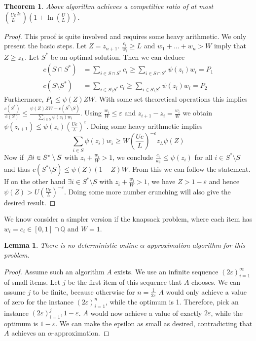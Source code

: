 \documentclass[a4paper, 12pt]{article}
\newtheorem{theorem}{Theorem}[section]
\newtheorem{lemma}{Lemma}[section]
\begin{document}
	\begin{theorem}
		Above algorithm achieves a competitive ratio of at most $\left(\frac{Ue}{L}^{2\varepsilon}\right)\left(1+\ln \left(\frac{U}{L}\right)\right)$. 
	\end{theorem}
	\begin{proof}
		This proof is quite involved and requires some heavy arithmetic. We only present the basic steps.
		Let $Z = z_{n+1}$. $\frac{c_i}{w_i} \geq L$ and $w_1+...+w_n > W$ imply that $Z \geq z_L$. Let $S^*$ be an optimal solution. Then we can deduce \begin{align}
			c(S \cap S^*) &= \sum_{i \in S\cap S^*} c_i \geq \sum_{i \in S\cap S^*}\psi(z_i)w_i = P_1\\
			c(S\setminus S^*) &= \sum_{i \in S\setminus S^*} c_i \geq \sum_{i \in S\setminus S^*} \psi(z_i)w_i = P_2
		\end{align}
	Furthermore, \(P_1 \leq \psi(Z)ZW\). With some set theoretical operations this implies $\frac{c(S^*)}{c(S)} \leq \frac{\psi(Z)ZW + c(S^*\setminus S)}{\sum_{i \in S}\psi(z_i)w_i}$. Using $\frac{w_i}{W} \leq \varepsilon$ and $z_{i+1} - z_i = \frac{w_i}{W}$ we obtain $\psi(z_{i+1}) \leq \psi(z_i)\left(\frac{Ue}{L}\right)^\varepsilon$. Doing some heavy arithmetic implies \[\sum_{i \in S}\psi(z_i)w_i \geq W\left(\frac{Ue}{L}\right)^{-\varepsilon}z_L\psi(Z)\]
	Now if $\not\exists i \in S^*\setminus S$ with $z_i + \frac{w_i}{W} > 1$, we conclude $\frac{c_i}{w_i} \leq \psi(z_i)$ for all $i \in S^*\setminus S$ and thus $c(S^*\setminus S) \leq \psi(Z)(1-Z)W$. From this we can follow the statement.\\
	If on the other hand $\exists i \in S^* \setminus S$ with $z_i + \frac{w_i}{W} > 1$, we have $Z > 1-\varepsilon$ and hence $\psi(Z) > U\left(\frac{Ue}{L}\right)^{-\varepsilon}$. Doing some more number crunching will also give the desired result.
	\end{proof}
	We know consider a simpler version if the knapsack problem, where each item has $w_i = c_i \in [0,1] \cap \mathbb{Q}$ and $W=1$.
	\begin{lemma}
		There is no deterministic online $\alpha$-approximation algorithm for this problem.
	\end{lemma}  
	\begin{proof}
		Assume such an algorithm $A$ exists. We use an infinite sequence $(2\varepsilon)_{i=1}^\infty$ of small items. Let $j$ be the first item of this sequence that $A$ chooses. We can assume $j$ to be finite, because otherwise for $n = \frac{1}{2\varepsilon}$ $A$ would only achieve a value of zero for the instance $(2\varepsilon)_{i=1}^n$, while the optimum is 1. Therefore, pick an instance $(2\varepsilon)_{i=1}^j, 1-\varepsilon$. $A$ would now achieve a value of exactly $2\varepsilon$, while the optimum is $1-\varepsilon$. We can make the epsilon as small as desired, contradicting that $A$ achieves an $\alpha$-approximation. 
	\end{proof}
\end{document}
